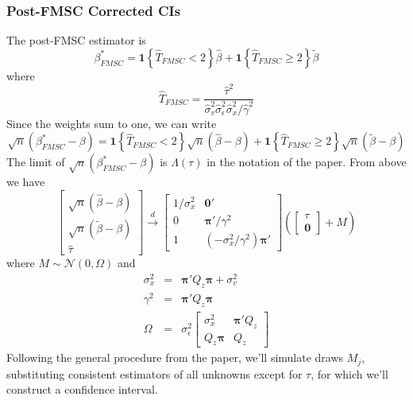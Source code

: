 \documentclass[12pt]{article}
\theoremstyle{definition}
\begin{document}
\subsubsection{Post-FMSC Corrected CIs}
The post-FMSC estimator is
  $$\beta^*_{FMSC} = \textbf{1}\left\{\widehat{T}_{FMSC} < 2 \right\} \widehat{\beta} + \textbf{1}\left\{\widehat{T}_{FMSC} \geq 2 \right\} \widetilde{\beta}$$
where
  $$\widehat{T}_{FMSC} = \frac{\widehat{\tau}^2 }{\widehat{\sigma}_v^2 \widehat{\sigma}_\epsilon^2 \widehat{\sigma}_x^2/\widehat{\gamma}^2}$$    
Since the weights sum to one, we can write
  $$\sqrt{n}(\beta^*_{FMSC} - \beta) = \textbf{1}\left\{\widehat{T}_{FMSC} < 2 \right\} \sqrt{n}(\widehat{\beta} - \beta) + \textbf{1}\left\{\widehat{T}_{FMSC} \geq 2 \right\}\sqrt{n}( \widetilde{\beta}-\beta)$$
The limit of $\sqrt{n}(\beta^*_{FMSC} - \beta)$ is $\Lambda(\tau)$ in the notation of the paper. From above we have
  $$
\left[
\begin{array}{c}
  \sqrt{n}\left(\widehat{\beta} - \beta\right) \\
  \sqrt{n}\left(\widetilde{\beta} - \beta\right)\\
  \widehat{\tau}
\end{array}
\right] \overset{d}{\rightarrow} 
\left[\begin{array}{cc}
1/\sigma_x^2 & \mathbf{0}'\\
  0 & \boldsymbol{\pi}'/\gamma^2\\
  1 & (-\sigma_x^2/\gamma^2) \boldsymbol{\pi}'
  \end{array}
  \right]\left( \left[\begin{array}{c} \tau \\ \mathbf{0}  \end{array} \right] + M\right)
$$
where $M \sim \mathcal{N}(0, \Omega)$ and
  \begin{eqnarray}
 \sigma_x^2&=&\boldsymbol{\pi}'Q_z \boldsymbol{\pi}  +\sigma^2_v \\
    \gamma^2 &=& \boldsymbol{\pi}'Q_z \boldsymbol{\pi}\\
    \Omega &=& \sigma_\epsilon^2\left[ \begin{array}{cc}
\sigma_x^2
&\boldsymbol{\pi}'Q_z\\
  Q_z \boldsymbol{\pi}&Q_z
  \end{array}\right]
  \end{eqnarray}
Following the general procedure from the paper, we'll simulate draws $M_j$, substituting consistent estimators of all unknowns except for $\tau$, for which we'll construct a confidence interval.
\end{document}
